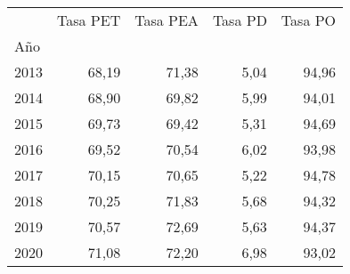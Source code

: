 \begin{tabular}{lllll}
\cline{1-5}
\multicolumn{1}{c}{} &
  \multicolumn{1}{|r}{Tasa PET} &
  \multicolumn{1}{r}{Tasa PEA} &
  \multicolumn{1}{r}{Tasa PD} &
  \multicolumn{1}{r}{Tasa PO} \\
\cline{1-5}
\multicolumn{1}{l}{Año} &
  \multicolumn{1}{|r}{} &
  \multicolumn{1}{r}{} &
  \multicolumn{1}{r}{} &
  \multicolumn{1}{r}{} \\
\multicolumn{1}{l}{\hspace{1em}2013} &
  \multicolumn{1}{|r}{68,19} &
  \multicolumn{1}{r}{71,38} &
  \multicolumn{1}{r}{5,04} &
  \multicolumn{1}{r}{94,96} \\
\multicolumn{1}{l}{\hspace{1em}2014} &
  \multicolumn{1}{|r}{68,90} &
  \multicolumn{1}{r}{69,82} &
  \multicolumn{1}{r}{5,99} &
  \multicolumn{1}{r}{94,01} \\
\multicolumn{1}{l}{\hspace{1em}2015} &
  \multicolumn{1}{|r}{69,73} &
  \multicolumn{1}{r}{69,42} &
  \multicolumn{1}{r}{5,31} &
  \multicolumn{1}{r}{94,69} \\
\multicolumn{1}{l}{\hspace{1em}2016} &
  \multicolumn{1}{|r}{69,52} &
  \multicolumn{1}{r}{70,54} &
  \multicolumn{1}{r}{6,02} &
  \multicolumn{1}{r}{93,98} \\
\multicolumn{1}{l}{\hspace{1em}2017} &
  \multicolumn{1}{|r}{70,15} &
  \multicolumn{1}{r}{70,65} &
  \multicolumn{1}{r}{5,22} &
  \multicolumn{1}{r}{94,78} \\
\multicolumn{1}{l}{\hspace{1em}2018} &
  \multicolumn{1}{|r}{70,25} &
  \multicolumn{1}{r}{71,83} &
  \multicolumn{1}{r}{5,68} &
  \multicolumn{1}{r}{94,32} \\
\multicolumn{1}{l}{\hspace{1em}2019} &
  \multicolumn{1}{|r}{70,57} &
  \multicolumn{1}{r}{72,69} &
  \multicolumn{1}{r}{5,63} &
  \multicolumn{1}{r}{94,37} \\
\multicolumn{1}{l}{\hspace{1em}2020} &
  \multicolumn{1}{|r}{71,08} &
  \multicolumn{1}{r}{72,20} &
  \multicolumn{1}{r}{6,98} &
  \multicolumn{1}{r}{93,02} \\
\cline{1-5}
\end{tabular}
